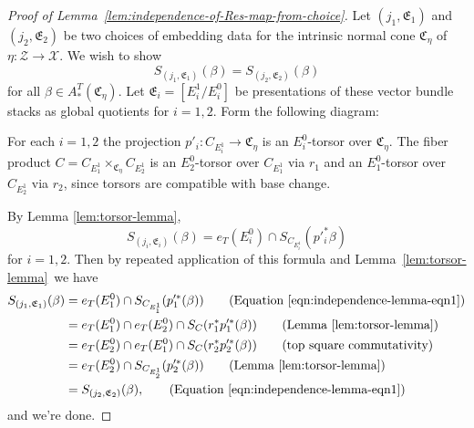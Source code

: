 \begin{proof}[Proof of Lemma~\ref{lem:independence-of-Res-map-from-choice}]
  Let \((j_1, \mathfrak E_1)\) and \((j_2, \mathfrak E_2)\) be two choices of embedding data for the intrinsic normal cone \(\mathfrak C_\eta\) of \(\eta:\mathcal Z\to \mathcal X\). We wish to show
  \[S_{(j_1, \mathfrak E_1)}(\beta) = S_{(j_2, \mathfrak E_2)}(\beta)\] for all \(\beta \in A^T_*(\mathfrak C_\eta)\).
  Let \(\mathfrak E_i = [E^1_i/E^0_i]\) be presentations of these vector bundle stacks as global quotients for \(i = 1,2\). Form the following diagram:
  \begin{center}
  \end{center}
  For each \(i=1,2\) the projection \(p'_i:C_{E^1_i}\to \mathfrak C_\eta\) is an \(E^0_i\)-torsor over \(\mathfrak C_\eta\). The fiber product \(C = C_{E^1_1}\times_{\mathfrak C_\eta}C_{E^1_2}\) is an \(E^0_2\)-torsor over \(C_{E^1_1}\) via \(r_1\) and an \(E^0_1\)-torsor over \(C_{E^1_2}\) via \(r_2\), since torsors are compatible with base change.

  By Lemma \ref{lem:torsor-lemma},
  \begin{equation}\label{eqn:independence-lemma-eqn1}
    S_{(j_i, \mathfrak E_i)}(\beta) = e_T(E^0_i) \cap S_{C_{E^1_i}}(p'^*_i\beta)
  \end{equation}
  for \(i = 1,2\). Then by repeated application of this formula and Lemma~\ref{lem:torsor-lemma}~we have
  \begin{align*}
    S_{(j_1, \mathfrak E_1)}(\beta) &= e_T(E^0_1) \cap S_{C_{E^1_1}}(p'^*_1(\beta)) \tag{Equation \eqref{eqn:independence-lemma-eqn1}}\\
    &= e_T(E^0_1) \cap e_T(E^0_2) \cap S_{C}(r_1^*p'^*_1(\beta)) \tag{Lemma~\ref{lem:torsor-lemma}}\\
    &= e_T(E^0_2) \cap e_T(E^0_1) \cap S_{C}(r_2^*p'^*_2(\beta)) \tag{top square commutativity}\\
    &= e_T(E^0_2) \cap S_{C_{E^1_2}}(p'^*_2(\beta)) \tag{Lemma~\ref{lem:torsor-lemma}}\\
    &= S_{(j_2, \mathfrak E_2)}(\beta), \tag{Equation \eqref{eqn:independence-lemma-eqn1}}
  \end{align*}
  and we're done.
\end{proof}
